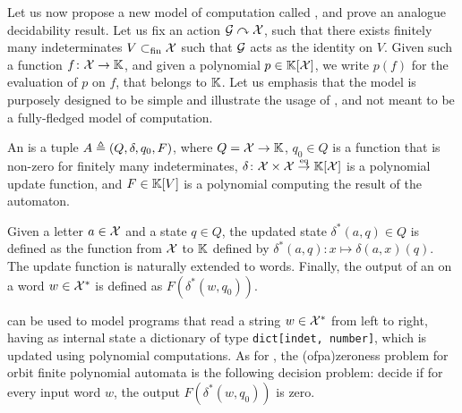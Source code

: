 \AP Let us now propose a new model of computation called , and prove an analogue decidability result. Let us fix an
 action $\mathcal{G} \curvearrowright \mathcal{X}$, such that there
exists finitely many indeterminates $V \subset_{\text{fin}} \mathcal{X}$ such that $\mathcal{G}$ acts
as the identity on $V$. Given such a function $f \colon \mathcal{X} \to \mathbb{K}$, and
given a polynomial $p \in \mathbb{K}[\mathcal{X}]$, we write $p(f)$ for the
evaluation of $p$ on $f$, that belongs to $\mathbb{K}$. Let us emphasis that the model
is purposely designed to be simple and illustrate the usage of , and not meant to be a fully-fledged model of computation.

\begin{definition}
  \label{def:orbit-finite-polynomial-automaton}
  An  is a tuple $A \triangleq (Q, \delta, q_0, F)$, where $Q =
  \mathcal{X} \to \mathbb{K}$, $q_0 \in Q$ is a function that is non-zero for finitely
  many indeterminates, $\delta \colon
  \Indets \times \Indets \toequiv \poly{\K}{\Indets}$ 
  is a
  polynomial update function, and $F \in \mathbb{K}[V]$ is a polynomial 
  computing the result of the automaton. 

  Given a letter $a \in \mathcal{X}$ and a
  state $q \in Q$, the updated state $\delta^*(a,q)  \in Q$ is defined as the function from
  $\mathcal{X}$ to $\mathbb{K}$ defined by $\delta^*(a,q) \colon x \mapsto \delta(a,x)( q )$.
  The update function is naturally extended to words. Finally, the
  output of an  on a word $w \in \mathcal{X}^*$
  is defined as $F(\delta^*(w,q_0))$.
\end{definition}

\AP {} can be used to model programs that
read a string $w \in \mathcal{X}^*$ from left to right, having as internal state a
dictionary of type \texttt{dict[indet, number]}, which is updated using
polynomial computations. As for , the
\intro(ofpa){zeroness problem} for orbit finite polynomial automata is the
following decision problem: decide if for every input word $w$, the output
$F(\delta^*(w, q_0))$ is zero.

